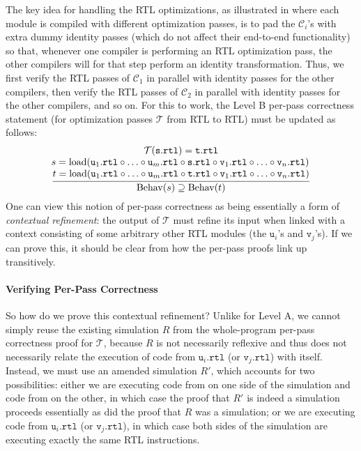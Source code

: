The key idea for handling the RTL optimizations, as illustrated in  where
each module is compiled with different optimization passes, is to pad the $\mathcal{C}_i$'s with
extra dummy identity passes (which do not affect their end-to-end functionality) so that, whenever
one compiler is performing an RTL optimization pass, the other compilers will for that step perform
an identity transformation.  Thus, we first verify the RTL passes of $\mathcal{C}_1$ in parallel
with identity passes for the other compilers, then verify the RTL passes of $\mathcal{C}_2$ in
parallel with identity passes for the other compilers, and so on.  For this to work, the Level B
per-pass correctness statement (for optimization passes $\mathcal{T}$ from RTL to RTL) must be
updated as follows:
\[
\frac{
\begin{array}{@{}c@{}}
\mathcal{T}(\mathtt{s.rtl}) = \mathtt{t.rtl} \\
\!s = \mathrm{load}(\mathtt{u}_1\mathtt{.rtl}\circ \ldots \circ \mathtt{u}_m\mathtt{.rtl}\circ\mathtt{s.rtl} \circ \mathtt{v}_1\mathtt{.rtl}\circ \ldots \circ \mathtt{v}_n\mathtt{.rtl})\\
t = \mathrm{load}(\mathtt{u}_1\mathtt{.rtl}\circ \ldots \circ \mathtt{u}_m\mathtt{.rtl}\circ\mathtt{t.rtl}\circ \mathtt{v}_1\mathtt{.rtl}\circ \ldots \circ \mathtt{v}_n\mathtt{.rtl})
\end{array}
}
{
\mathrm{Behav}(s) 
\supseteq \mathrm{Behav}(t)
}
\]
One can view this notion of per-pass correctness as being essentially
a form of \emph{contextual refinement}: the output of $\mathcal{T}$
must refine its input when linked with a context consisting of some
arbitrary other RTL modules (the $\mathtt{u}_i$'s and
$\mathtt{v}_j$'s).  If we can prove this, it should be clear from
 how the per-pass proofs link up transitively.

\paragraph{Verifying Per-Pass Correctness}

So how do we prove this contextual refinement?  Unlike for Level A, we
cannot simply reuse the existing simulation $R$ from the whole-program
per-pass correctness proof for $\mathcal{T}$, because $R$ is not
necessarily reflexive and thus does not necessarily relate the
execution of code from $\mathtt{u}_i\mathtt{.rtl}$ (or
$\mathtt{v}_j\mathtt{.rtl}$) with itself.  Instead, we must use an
amended simulation $R'$, which accounts for two possibilities: either
we are executing code from  on one side of the simulation and
code from  on the other, in which case the proof that $R'$ is
indeed a simulation proceeds essentially as did the proof that $R$
was a simulation; or we are executing code from
$\mathtt{u}_i\mathtt{.rtl}$ (or $\mathtt{v}_j\mathtt{.rtl}$), in which
case both sides of the simulation are executing exactly the same
RTL instructions.

